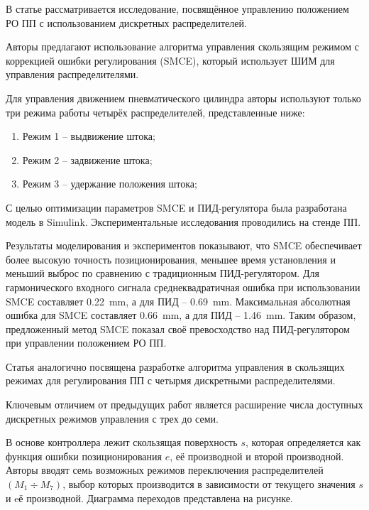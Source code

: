 

В статье \cite*{Elsayed} рассматривается исследование, посвящённое управлению положением РО ПП
с использованием дискретных распределителей.

Авторы предлагают использование алгоритма управления скользящим режимом с коррекцией ошибки регулирования (SMCE), который использует
ШИМ для управления распределителями.

Для управления движением пневматического цилиндра авторы используют только три режима работы
четырёх распределителей, представленные ниже:
\begin{enumerate}
    \item Режим 1 -- выдвижение штока;
    \item Режим 2 -- задвижение штока;
    \item Режим 3 -- удержание положения штока;
\end{enumerate}

С целью оптимизации параметров SMCE и ПИД-регулятора была разработана модель в Simulink.
Экспериментальные исследования проводились на стенде ПП.

Результаты моделирования и экспериментов показывают, что SMCE обеспечивает более высокую точность
позиционирования, меньшее время установления и меньший выброс по сравнению с традиционным ПИД-регулятором.
Для гармонического входного сигнала среднеквадратичная ошибка при использовании SMCE составляет \num{0.22}~\si{\milli\metre}, а
для ПИД -- \num{0.69}~\si{\milli\metre}. Максимальная абсолютная ошибка для SMCE составляет \num{0.66}~\si{\milli\metre},
а для ПИД -- \num{1.46}~\si{\milli\metre}. Таким образом,
предложенный метод SMCE показал своё превосходство над ПИД-регулятором при управлении положением РО ПП.

Статья \cite*{Hodgson:article1} аналогично посвящена разработке алгоритма управления в скользящих режимах
для регулирования ПП
с четырмя дискретными распределителями.

Ключевым отличием от предыдущих работ является расширение числа доступных дискретных режимов управления
с трех до семи.

В основе контроллера лежит скользящая поверхность $s$, которая определяется как функция ошибки позиционирования $e$,
её производной и второй производной. Авторы вводят семь возможных режимов переключения распределителей $(M_1 \div M_7)$,
выбор которых производится в зависимости от текущего значения $s$ и eё производной. Диаграмма переходов
представлена на рисунке.

